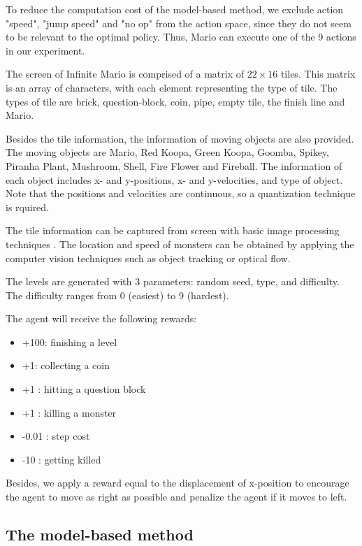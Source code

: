 To reduce the computation cost of the model-based method, 
we exclude action "speed", "jump speed" and "no op" from the 
action space, since they do not seem to be relevant to the optimal policy.
Thus, Mario can execute one of the 9 actions in our experiment.

The screen of Infinite Mario is comprised of a matrix of $22 \times 16$ tiles.
This matrix is an array of characters, with each element representing the type of tile.
The types of tile are brick, question-block, coin, pipe, empty tile, the finish line and Mario.

Besides the tile information, the information of moving objects are also provided. 
The moving objects are Mario, Red Koopa, Green Koopa, Goomba, Spikey, Piranha Plant, Mushroom, Shell, Fire Flower and Fireball.
The information of each object includes x- and y-positions, x- and y-velocities, and type of object.
Note that the positions and velocities are continuous, so a quantization technique is rquired.

The tile information can be captured from screen with basic image processing techniques \cite{Yavar}.
The location and speed of monsters can be obtained by applying the computer vision techniques such
as object tracking or optical flow.

The levels are generated with 3 parameters: random seed, type, and difficulty.
The difficulty ranges from 0 (easiest) to 9 (hardest). 

The agent will receive the following rewards:
\begin{itemize}
\item +100: finishing a level
\item +1: collecting a coin
\item +1 : hitting a question block
\item +1 : killing a monster
\item -0.01 : step cost
\item -10 : getting killed
\end{itemize}

Besides, we apply a reward equal to the
displacement of x-position to encourage the agent to move as right as possible
and penalize the agent if it moves to left.

\subsection{The model-based method}

